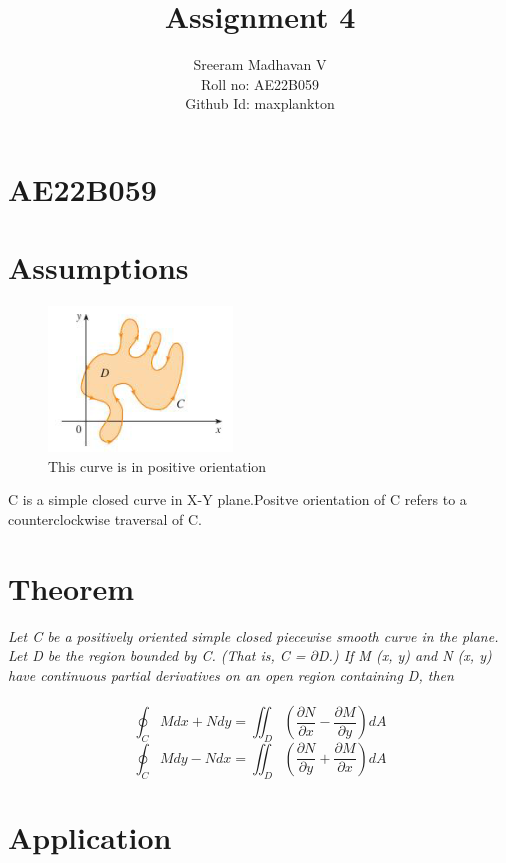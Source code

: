 \documentclass{article}
\title{Assignment 4}
\author{Sreeram Madhavan V\\Roll no: AE22B059\\Github Id: maxplankton}
\date{}
\begin{document}
\maketitle

\section*{AE22B059}
\section*{Assumptions}
\begin{figure}[h!]
    \centering
    \includegraphics{Screenshot from 2023-06-18 01-03-52.png}
    \caption{This curve is in positive orientation}
    \label{fig:enter-label}
\end{figure}
C is a simple closed curve in X-Y plane.Positve orientation of C refers to a counterclockwise traversal of C.
\section*{Theorem}
\emph{Let C be a positively oriented simple closed piecewise smooth
curve in the plane. Let D be the region bounded by C. (That is, C = $\partial$D.) If M (x, y) and N (x, y)
have continuous partial derivatives on an open region containing D, then}\\\\
\begin{equation}
\oint_{C}Mdx+Ndy=\iint_{D}(\frac{\partial N}{\partial x}-\frac{\partial M}{\partial y})dA 
\end{equation}
\begin{equation}
\oint_{C}Mdy-Ndx=\iint_{D}(\frac{\partial N}{\partial y}+\frac{\partial M}{\partial x})dA
\end{equation}
\section*{Application}
\end{document}
